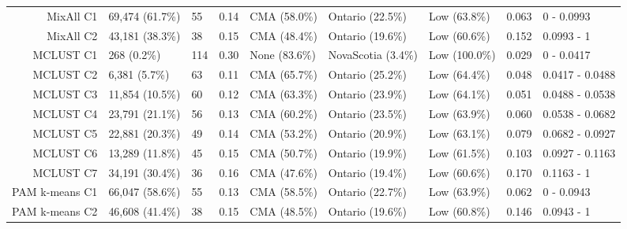 \documentclass[11pt, a4paper]{article}
\begin{document}
\begin{table}[H]
{\begin{tabular}{|r|llllllll|}
  MixAll C1 & 69,474 (61.7\%) & 55 & 0.14 & CMA (58.0\%) & Ontario (22.5\%) & Low (63.8\%) & 0.063 & 0 - 0.0993 \\ 
  MixAll C2 & 43,181 (38.3\%) & 38 & 0.15 & CMA (48.4\%) & Ontario (19.6\%) & Low (60.6\%) & 0.152 & 0.0993 - 1 \\ 
\rowcolor{gray!25}  MCLUST C1 & 268 (0.2\%) & 114 & 0.30 & None (83.6\%) & NovaScotia (3.4\%) & Low (100.0\%) & 0.029 & 0 - 0.0417 \\ 
\rowcolor{gray!25}  MCLUST C2 & 6,381 (5.7\%) & 63 & 0.11 & CMA (65.7\%) & Ontario (25.2\%) & Low (64.4\%) & 0.048 & 0.0417 - 0.0488 \\ 
\rowcolor{gray!25}  MCLUST C3 & 11,854 (10.5\%) & 60 & 0.12 & CMA (63.3\%) & Ontario (23.9\%) & Low (64.1\%) & 0.051 & 0.0488 - 0.0538 \\ 
 \rowcolor{gray!25} MCLUST C4 & 23,791 (21.1\%) & 56 & 0.13 & CMA (60.2\%) & Ontario (23.5\%) & Low (63.9\%) & 0.060 & 0.0538 - 0.0682 \\ 
 \rowcolor{gray!25} MCLUST C5 & 22,881 (20.3\%) & 49 & 0.14 & CMA (53.2\%) & Ontario (20.9\%) & Low (63.1\%) & 0.079 & 0.0682 - 0.0927 \\ 
\rowcolor{gray!25}  MCLUST C6 & 13,289 (11.8\%) & 45 & 0.15 & CMA (50.7\%) & Ontario (19.9\%) & Low (61.5\%) & 0.103 & 0.0927 - 0.1163 \\ 
\rowcolor{gray!25}  MCLUST C7 & 34,191 (30.4\%) & 36 & 0.16 & CMA (47.6\%) & Ontario (19.4\%) & Low (60.6\%) & 0.170 & 0.1163 - 1 \\ 
  PAM k-means C1 & 66,047 (58.6\%) & 55 & 0.13 & CMA (58.5\%) & Ontario (22.7\%) & Low (63.9\%) & 0.062 & 0 - 0.0943 \\ 
  PAM k-means C2 & 46,608 (41.4\%) & 38 & 0.15 & CMA (48.5\%) & Ontario (19.6\%) & Low (60.8\%) & 0.146 & 0.0943 - 1 \\ 
   \hline
\end{tabular}
}
\end{table}
\end{document}
